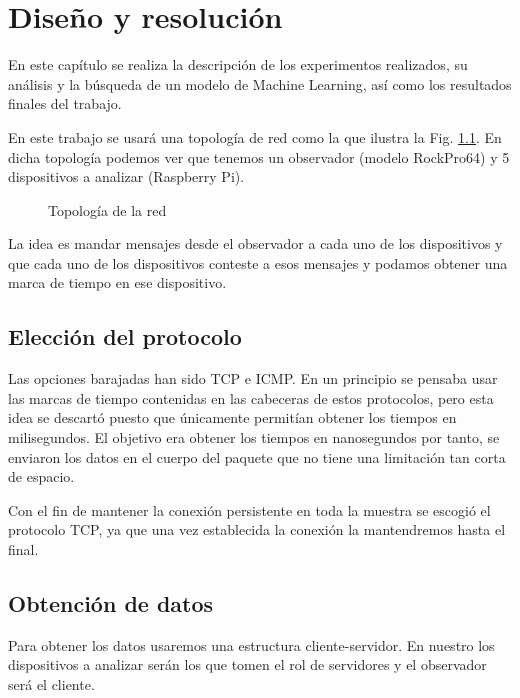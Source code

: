 
\chapter{Diseño y resolución} \label{chap:diseno}

En este capítulo se realiza la descripción de los experimentos realizados, su análisis y la búsqueda de un modelo de Machine Learning, así como los resultados finales del trabajo.

En este trabajo se usará una topología de red como la que ilustra la Fig. \ref{fig:top}. En dicha topología podemos ver que tenemos un observador (modelo RockPro64) y 5 dispositivos a analizar (Raspberry Pi).

\begin{figure}
    \centering
    \resizebox{0.5\textwidth}{!}{
        
    }
    \caption{Topología de la red}
    \label{fig:top}
\end{figure}

La idea es mandar mensajes desde el observador a cada uno de los dispositivos y que cada uno de los dispositivos conteste a esos mensajes y podamos obtener una marca de tiempo en ese dispositivo.

\section{Elección del protocolo}

Las opciones barajadas han sido TCP e ICMP. En un principio se pensaba usar las marcas de tiempo contenidas en las cabeceras de estos protocolos, pero esta idea se descartó puesto que únicamente permitían obtener los tiempos en milisegundos. El objetivo era obtener los tiempos en nanosegundos por tanto, se enviaron los datos en el cuerpo del paquete que no tiene una limitación tan corta de espacio. 

Con el fin de mantener la conexión persistente en toda la muestra se escogió el protocolo TCP, ya que una vez establecida la conexión la mantendremos hasta el final.

\section{Obtención de datos}

Para obtener los datos usaremos una estructura cliente-servidor. En nuestro los dispositivos a analizar serán los que tomen el rol de servidores y el observador será el cliente.


